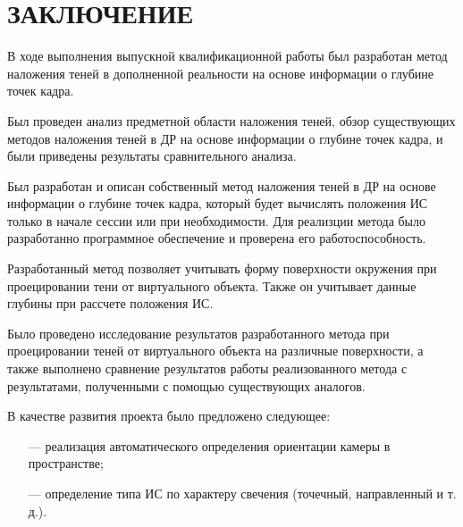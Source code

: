 \chapter*{ЗАКЛЮЧЕНИЕ}

В ходе выполнения выпускной квалификационной работы был разработан метод наложения теней в дополненной реальности на основе информации о глубине точек кадра.

Был проведен анализ предметной области наложения теней, обзор существующих методов наложения теней в ДР на основе информации о глубине точек кадра, и были приведены результаты сравнительного анализа.

Был разработан и описан собственный метод наложения теней в ДР на основе информации о глубине точек кадра, который будет вычислять положения ИС только в начале сессии или при необходимости. Для реализции метода было разработанно программное обеспечение и проверена его работоспособность.

Разработанный метод позволяет учитывать форму поверхности окружения при проецировании тени от виртуального объекта. Также он учитывает данные глубины при рассчете положения ИС.

Было проведено исследование результатов разработанного метода при проецировании теней от виртуального объекта на различные поверхности, а также выполнено сравнение результатов работы реализованного метода с результатами, полученными с помощью существующих аналогов.

В качестве развития проекта было предложено следующее:

\begin{itemize}
	\item[---] реализация автоматического определения ориентации камеры в пространстве;
	\item[---] определение типа ИС по характеру свечения (точечный, направленный и т. д.).
\end{itemize}